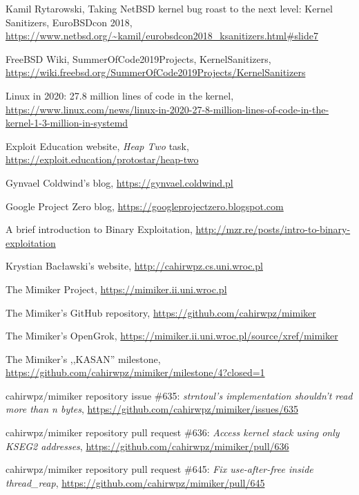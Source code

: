 \documentclass[shortabstract, manyadvisors, english, mgr]{iithesis}
\theoremstyle{definition} \newtheorem*{definition}{Definicja}
\theoremstyle{definition} \newtheorem*{example}{Przykład}
\theoremstyle{definition} \newtheorem*{remark}{Uwaga}
\begin{document}
\begin{thebibliography}{99}
Kamil Rytarowski,
Taking NetBSD kernel bug roast to the next level: Kernel Sanitizers,
EuroBSDcon 2018,
\url{https://www.netbsd.org/~kamil/eurobsdcon2018_ksanitizers.html#slide7}

FreeBSD Wiki, SummerOfCode2019Projects, KernelSanitizers,
\url{https://wiki.freebsd.org/SummerOfCode2019Projects/KernelSanitizers}

Linux in 2020: 27.8 million lines of code in the kernel,
\url{https://www.linux.com/news/linux-in-2020-27-8-million-lines-of-code-in-the-kernel-1-3-million-in-systemd}

Exploit Education website, \textit{Heap Two} task,
\url{https://exploit.education/protostar/heap-two}

Gynvael Coldwind's blog,
\url{https://gynvael.coldwind.pl}

Google Project Zero blog,
\url{https://googleprojectzero.blogspot.com}

A brief introduction to Binary Exploitation,
\url{http://mzr.re/posts/intro-to-binary-exploitation}

Krystian Bacławski's website,
\url{http://cahirwpz.cs.uni.wroc.pl}

The Mimiker Project,
\url{https://mimiker.ii.uni.wroc.pl}

The Mimiker's GitHub repository,
\url{https://github.com/cahirwpz/mimiker}

The Mimiker's OpenGrok,
\url{https://mimiker.ii.uni.wroc.pl/source/xref/mimiker}

The Mimiker's ,,KASAN'' milestone,
\url{https://github.com/cahirwpz/mimiker/milestone/4?closed=1}

cahirwpz/mimiker repository issue \#635:
\textit{strntoul's implementation shouldn't read more than n bytes},
\url{https://github.com/cahirwpz/mimiker/issues/635}

cahirwpz/mimiker repository pull request \#636:
\textit{Access kernel stack using only KSEG2 addresses},
\url{https://github.com/cahirwpz/mimiker/pull/636}

cahirwpz/mimiker repository pull request \#645:
\textit{Fix use-after-free inside thread\_reap},
\url{https://github.com/cahirwpz/mimiker/pull/645}


\end{thebibliography}
\end{document}
